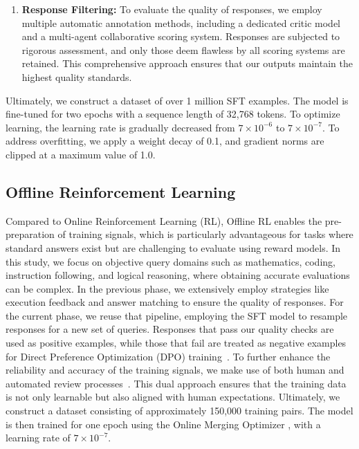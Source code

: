 \begin{enumerate}[label=(\arabic*)]
    \item \textbf{Response Filtering:}  To evaluate the quality of responses, we employ multiple automatic annotation methods, including a dedicated critic model and a multi-agent collaborative scoring system. Responses are subjected to rigorous assessment, and only those deem flawless by all scoring systems are retained. This comprehensive approach ensures that our outputs maintain the highest quality standards.
    
\end{enumerate}

Ultimately, we construct a dataset of over 1 million SFT examples. The model is fine-tuned for two epochs with a sequence length of 32,768 tokens. To optimize learning, the learning rate is gradually decreased from $7 \times 10^{-6}$ to $7 \times 10^{-7}$. To address overfitting, we apply a weight decay of 0.1, and gradient norms are clipped at a maximum value of 1.0.

\subsection{Offline Reinforcement Learning}

Compared to Online Reinforcement Learning (RL), Offline RL enables the pre-preparation of training signals, which is particularly advantageous for tasks where standard answers exist but are challenging to evaluate using reward models. 
In this study, we focus on objective query domains such as mathematics, coding, instruction following, and logical reasoning, where obtaining accurate evaluations can be complex.
In the previous phase, we extensively employ strategies like execution feedback and answer matching to ensure the quality of responses.
For the current phase, we reuse that pipeline, employing the SFT model to resample responses for a new set of queries. Responses that pass our quality checks are used as positive examples, while those that fail are treated as negative examples for Direct Preference Optimization (DPO) training~\citep{rafailov2024direct}.
To further enhance the reliability and accuracy of the training signals, we make use of both human and automated review processes~\citep{cao2024towards}. This dual approach ensures that the training data is not only learnable but also aligned with human expectations.
Ultimately, we construct a dataset consisting of approximately 150,000 training pairs. 
The model is then trained for one epoch using the Online Merging Optimizer \citep{lu2024online}, with a learning rate of $7 \times 10^{-7}$.

